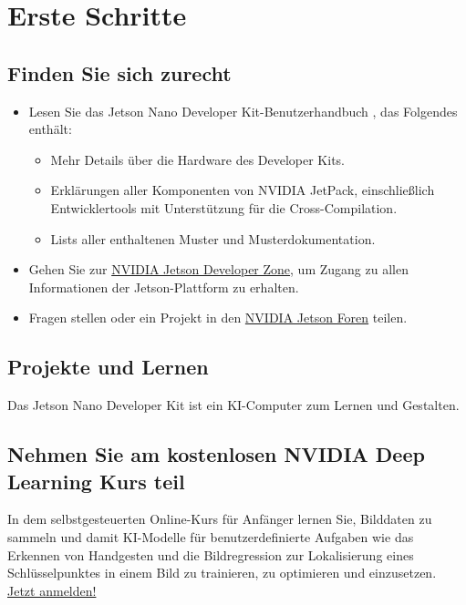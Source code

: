 %
%


\chapter{Erste Schritte}

\section{Finden Sie sich zurecht}

\begin{itemize}
    \item Lesen Sie das Jetson Nano Developer Kit-Benutzerhandbuch \cite{JetsonUserGuide:2019}, das Folgendes enthält: 
    \begin{itemize}
        \item Mehr Details über die Hardware des Developer Kits.
        \item Erklärungen aller Komponenten von NVIDIA JetPack, einschließlich Entwicklertools mit Unterstützung für die Cross-Compilation.
        \item Lists aller enthaltenen Muster und Musterdokumentation.
    \end{itemize}
    \item Gehen Sie zur \href{https://developer.nvidia.com/jetson}{NVIDIA Jetson Developer Zone}, um Zugang zu allen Informationen der Jetson-Plattform zu erhalten.
    \item Fragen stellen oder ein Projekt in den \href{https://devtalk.nvidia.com/default/board/372/jetson-projects/}{NVIDIA Jetson Foren} teilen. 
\end{itemize}


\section{Projekte und Lernen}

Das Jetson Nano Developer Kit ist ein KI-Computer zum Lernen und Gestalten.

\section{Nehmen Sie am kostenlosen NVIDIA Deep Learning Kurs teil}

In dem selbstgesteuerten Online-Kurs für Anfänger lernen Sie, Bilddaten zu sammeln und damit KI-Modelle für benutzerdefinierte Aufgaben wie das Erkennen von Handgesten und die Bildregression zur Lokalisierung eines Schlüsselpunktes in einem Bild zu trainieren, zu optimieren und einzusetzen. \href{https://courses.nvidia.com/courses/course-v1:DLI+C-RX-02+V1/about}{Jetzt anmelden!}


